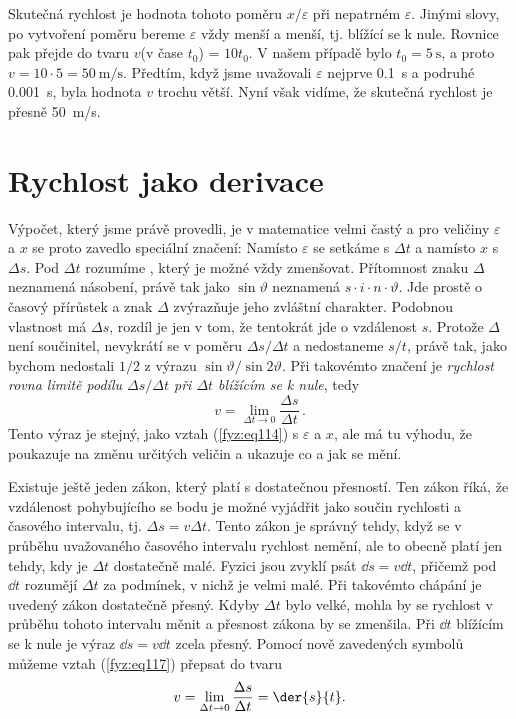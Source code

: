     Skutečná rychlost je hodnota tohoto poměru \(x/\varepsilon\) při nepatrném \(\varepsilon\). 
    Jinými slovy, po vytvoření poměru bereme \(\varepsilon\) vždy menší a menší, tj. blížící se k 
    nule. Rovnice pak přejde do tvaru \(v\)(v čase \(t_0\)) = \(10t_0\). V našem případě bylo \(t_0 
    = \qty{5}{\s}\), a proto \(v = 10\cdot5 = \qty{50}{\m/\s}\). Předtím, když jsme uvažovali 
    \(\varepsilon\) nejprve \qty{0.1}{\s} a podruhé \qty{0.001}{\s}, byla hodnota \(v\) trochu větší. 
    Nyní však vidíme, že skutečná rychlost je přesně \qty{50}{\m/\s}.
    
  \section{Rychlost jako derivace}
    Výpočet, který jsme právě provedli, je v matematice velmi častý a pro veličiny \(\varepsilon\) 
    a \(x\) se proto zavedlo speciální značení: Namísto \(\varepsilon\) se setkáme s \(\Delta t\) a 
    namísto \(x\) s \(\Delta s\). Pod \(\Delta t\) rozumíme , který je 
    možné vždy zmenšovat. Přítomnost znaku \(\Delta\) neznamená násobení, právě tak jako 
    \(\sin\vartheta\) neznamená \(s\cdot i \cdot n \cdot \vartheta\). Jde prostě o časový přírůstek 
    a znak \(\Delta\) zvýrazňuje jeho zvláštní charakter. Podobnou vlastnost má \(\Delta s\), 
    rozdíl je jen v tom, že tentokrát jde o vzdálenost \(s\). Protože \(\Delta\) není součinitel, 
    nevykrátí se v poměru \(\Delta s/\Delta t\) a nedostaneme \(s/t\), právě tak, jako bychom 
    nedostali \(1/2\) z výrazu \(\sin \vartheta/\sin2\vartheta\). Při takovémto značení je 
    \emph{rychlost rovna limitě podílu \(\Delta s/\Delta t\) při \(\Delta t\) blížícím se k nule}, 
    tedy
    \begin{equation}\label{fyz:eq117}
      \boxed{v = \lim_{\Delta t\to 0}{\frac{\Delta s}{\Delta t}}}\,.
    \end{equation}
    Tento výraz je stejný, jako vztah (\ref{fyz:eq114}) s \(\varepsilon\) a \(x\), ale má tu 
    výhodu, že poukazuje na změnu určitých veličin a ukazuje co a jak se mění.
    
    Existuje ještě jeden zákon, který platí s dostatečnou přesností. Ten zákon říká, že vzdálenost 
    pohybujícího se bodu je možné vyjádřit jako součin rychlosti a časového intervalu, tj. \(\Delta 
    s = v\Delta t\). Tento zákon je správný tehdy, když se v průběhu uvažovaného časového intervalu 
    rychlost nemění, ale to obecně platí jen tehdy, kdy je \(\Delta t\) dostatečně malé. Fyzici 
    jsou zvyklí psát \(\dd{s} = v\dd{t}\), přičemž pod \(\dd{t}\) rozumějí \(\Delta t\) za 
    podmínek, v nichž je velmi malé. Při takovémto chápání je uvedený zákon dostatečně přesný. 
    Kdyby \(\Delta t\) bylo velké, mohla by se rychlost v průběhu tohoto intervalu měnit a přesnost 
    zákona by se zmenšila. Při \(\dd{t}\) blížícím se k nule je výraz \(\dd{s} = v\dd{t}\) zcela 
    přesný. Pomocí nově zavedených symbolů můžeme vztah (\ref{fyz:eq117}) přepsat do tvaru
    \begin{equation}\label{fyz:eq118}
      v = \lim_{\Delta t\to 0}{\frac{\Delta s}{\Delta t}} = \der{s}{t}.
    \end{equation}
    
